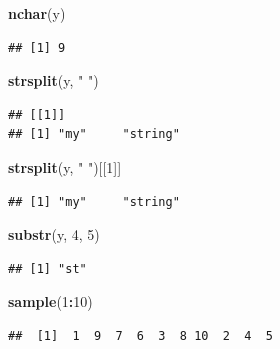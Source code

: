 \documentclass[10pt,]{krantz}
\makeatletter
\newenvironment{Shaded}{\begin{snugshade}}{\end{snugshade}}
\newcommand{\KeywordTok}[1]{\textcolor[rgb]{0.13,0.29,0.53}{\textbf{#1}}}
\newcommand{\DecValTok}[1]{\textcolor[rgb]{0.00,0.00,0.81}{#1}}
\newcommand{\StringTok}[1]{\textcolor[rgb]{0.31,0.60,0.02}{#1}}
\newcommand{\OperatorTok}[1]{\textcolor[rgb]{0.81,0.36,0.00}{\textbf{#1}}}
\newcommand{\NormalTok}[1]{#1}
\newenvironment{kframe}{%
\medskip{}
\setlength{\fboxsep}{.8em}
 \def\at@end@of@kframe{}%
 \ifinner\ifhmode%
  \def\at@end@of@kframe{\end{minipage}}%
  \begin{minipage}{\columnwidth}%
 \fi\fi%
 \def\FrameCommand##1{\hskip\@totalleftmargin \hskip-\fboxsep
 \colorbox{shadecolor}{##1}\hskip-\fboxsep
     \hskip-\linewidth \hskip-\@totalleftmargin \hskip\columnwidth}%
 \MakeFramed {\advance\hsize-\width
   \@totalleftmargin\z@ \linewidth\hsize
   \@setminipage}}%
 {\par\unskip\endMakeFramed%
 \at@end@of@kframe}
\renewenvironment{Shaded}{\begin{kframe}}{\end{kframe}}
\makeatother
\begin{document}
\begin{Shaded}
\begin{Highlighting}[]
\KeywordTok{nchar}\NormalTok{(y)}
\end{Highlighting}
\end{Shaded}

\begin{verbatim}
## [1] 9
\end{verbatim}

\begin{Shaded}
\begin{Highlighting}[]
\KeywordTok{strsplit}\NormalTok{(y, }\StringTok{" "}\NormalTok{)}
\end{Highlighting}
\end{Shaded}

\begin{verbatim}
## [[1]]
## [1] "my"     "string"
\end{verbatim}

\begin{Shaded}
\begin{Highlighting}[]
\KeywordTok{strsplit}\NormalTok{(y, }\StringTok{" "}\NormalTok{)[[}\DecValTok{1}\NormalTok{]]}
\end{Highlighting}
\end{Shaded}

\begin{verbatim}
## [1] "my"     "string"
\end{verbatim}

\begin{Shaded}
\begin{Highlighting}[]
\KeywordTok{substr}\NormalTok{(y, }\DecValTok{4}\NormalTok{, }\DecValTok{5}\NormalTok{)}
\end{Highlighting}
\end{Shaded}

\begin{verbatim}
## [1] "st"
\end{verbatim}

\begin{Shaded}
\begin{Highlighting}[]
\KeywordTok{sample}\NormalTok{(}\DecValTok{1}\OperatorTok{:}\DecValTok{10}\NormalTok{)}
\end{Highlighting}
\end{Shaded}

\begin{verbatim}
##  [1]  1  9  7  6  3  8 10  2  4  5
\end{verbatim}
\end{document}
